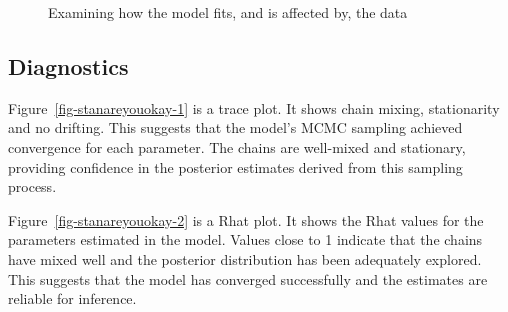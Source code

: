 \documentclass[
  letterpaper,
  DIV=11,
  numbers=noendperiod]{scrartcl}
\begin{document}
\begin{figure}
\begin{minipage}[t]{0.50\linewidth}
{{}

}

\end{minipage}%
\newline
\begin{minipage}[t]{0.50\linewidth}

{\centering 


}

\end{minipage}%

\caption{\label{fig-ppcheckandposteriorvsprior}Examining how the model
fits, and is affected by, the data}

\end{figure}

\hypertarget{diagnostics}{%
\subsection{Diagnostics}\label{diagnostics}}

Figure~\ref{fig-stanareyouokay-1} is a trace plot. It shows chain
mixing, stationarity and no drifting. This suggests that the model's
MCMC sampling achieved convergence for each parameter. The chains are
well-mixed and stationary, providing confidence in the posterior
estimates derived from this sampling process.

Figure~\ref{fig-stanareyouokay-2} is a Rhat plot. It shows the Rhat
values for the parameters estimated in the model. Values close to 1
indicate that the chains have mixed well and the posterior distribution
has been adequately explored. This suggests that the model has converged
successfully and the estimates are reliable for inference.
\end{document}
